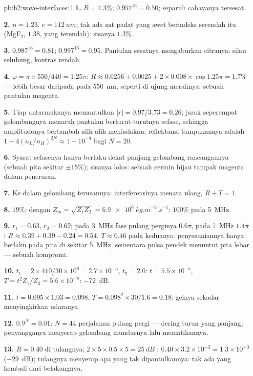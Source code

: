 \begin{solution}{pb:b2:wave-interfaces:1}
\textbf{1.} $R = 4.3\%$; $0.957^{16} = 0.50$; separuh cahayanya tersesat.

\textbf{2.} $n = 1.23$, $e = \qty{112}{nm}$; tak ada zat padat yang awet berindeks
serendah itu (MgF$_2$, $1.38$, yang terendah): sisanya $1.3\%$.

\textbf{3.} $0.987^{16} = 0.81$; $0.997^{16} = 0.95$. Pantulan sesatnya mengaburkan
citranya: silau selubung, kontras rendah.

\textbf{4.} $\varphi = \pi \times 550/440 = 1.25\pi$: $R \approx 0.0256 + 0.0025 + 2 \times 0.008 \times
\cos1.25\pi = 1.7\%$ --- lebih besar daripada pada \qty{550}{nm}, seperti di ujung merahnya: sebuah
pantulan magenta.

\textbf{5.} Tiap antarmukanya memantulkan $|r| = 0.97/3.73 = 0.26$; jarak
seperempat gelombangnya menaruh pantulan berturut-turutnya sefase, sehingga amplitudonya bertambah
alih-alih meniadakan; reflektansi tumpukannya adalah $1 - 4(n_L/n_H)^{2N}
\approx 1 - 10^{-9}$ bagi $N = 20$.

\textbf{6.} Syarat sefasenya hanya berlaku dekat panjang gelombang
rancangannya (sebuah pita sekitar $\pm15\%$); sisanya lolos: sebuah cermin hijau
tampak magenta dalam penerusan.

\textbf{7.} Ke dalam gelombang terusannya: interferensinya menata ulang,
$R + T = 1$.

\textbf{8.} $19\%$; dengan $Z_m = \sqrt{Z_1Z_2} = \qty{6.9e6}{kg.m^{-2}.s^{-1}}$: $100\%$ pada
\qty{5}{MHz}.

\textbf{9.} $r_1 = 0.63$, $r_2 = 0.62$; pada \qty{3}{MHz} fase pulang perginya
$0.6\pi$, pada \qty{7}{MHz} $1.4\pi$: $R \approx 0.39 + 0.39 - 0.24 = 0.54$, $T \approx 0.46$
pada keduanya: penyesuaiannya hanya berlaku pada pita di sekitar \qty{5}{MHz}, sementara
pulsa pendek menuntut pita lebar --- sebuah kompromi.

\textbf{10.} $t_1 = 2 \times 410/30 \times 10^6 = 2.7 \times 10^{-5}$, $t_2 = 2.0$: $t = 5.5 \times 10^{-5}$,
$T = t^2Z_1/Z_3 = 5.6 \times 10^{-8}$: \qty{-72}{dB}.

\textbf{11.} $t = 0.095 \times 1.03 = 0.098$, $T = 0.098^2 \times 30/1.6 = 0.18$: gelnya
sekadar menyingkirkan udaranya.

\textbf{12.} $0.9^N = 0.01$: $N = 44$ perjalanan pulang pergi --- dering turun yang panjang;
penyangganya menyerap gelombang mundurnya lalu mematikannya.

\textbf{13.} $R = 0.40$ di tulangnya; $2 \times 5 \times 0.5 \times 5 = \qty{25}{dB}$
: $0.40 \times 3.2 \times 10^{-3} = 1.3 \times 10^{-3}$ (\qty{-29}{dB}); tulangnya
menyerap apa yang tak dipantulkannya: tak ada yang kembali dari belakangnya.


\end{solution}
